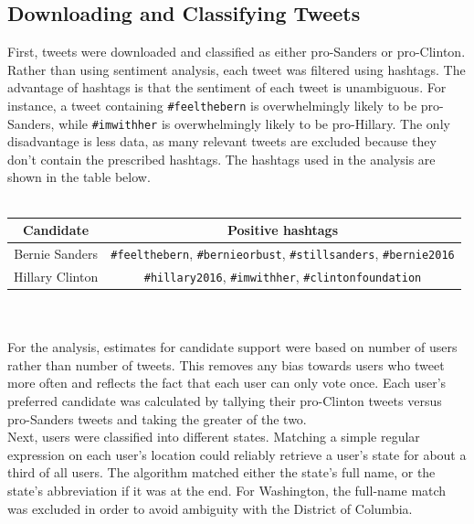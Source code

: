 \documentclass[12pt]{extarticle}
\begin{document}
\subsection{Downloading and Classifying Tweets}
First, tweets were downloaded and classified as either pro-Sanders or pro-Clinton.
Rather than using sentiment analysis, each tweet was filtered using hashtags.
The advantage of hashtags is that the sentiment of each tweet is unambiguous.
For instance, a tweet containing \texttt{\#feelthebern} is overwhelmingly likely to be pro-Sanders, while \texttt{\#imwithher} is overwhelmingly likely to be pro-Hillary.
The only disadvantage is less data, as many relevant tweets are excluded because they don't contain the prescribed hashtags.
The hashtags used in the analysis are shown in the table below.
\\
\\
\begin{centering}
	\begin{tabular}{|c|c|} \hline
    Candidate & Positive hashtags \\ \hline 
		Bernie Sanders & \texttt{\#feelthebern}, \texttt{\#bernieorbust}, \texttt{\#stillsanders}, \texttt{\#bernie2016} \\ \hline
		Hillary Clinton & \texttt{\#hillary2016}, \texttt{\#imwithher}, \texttt{\#clintonfoundation} \\ \hline
  \end{tabular}
\end{centering}
\\
\\
For the analysis, estimates for candidate support were based on number of users rather than number of tweets.
This removes any bias towards users who tweet more often and reflects the fact that each user can only vote once.
Each user's preferred candidate was calculated by tallying their pro-Clinton tweets versus pro-Sanders tweets and taking the greater of the two.
\\
\indent
Next, users were classified into different states.
Matching a simple regular expression on each user's location could reliably retrieve a user's state for about a third of all users.
The algorithm matched either the state's full name, or the state's abbreviation if it was at the end.
For Washington, the full-name match was excluded in order to avoid ambiguity with the District of Columbia.
\end{document}
